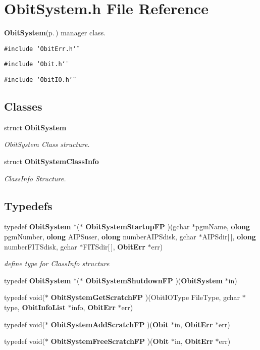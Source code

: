 \section{Obit\-System.h File Reference}
\label{ObitSystem_8h}
{\bf Obit\-System}{\rm (p.\,\pageref{structObitSystem})} manager class. 

{\tt \#include \char`\"{}Obit\-Err.h\char`\"{}}\par
{\tt \#include \char`\"{}Obit.h\char`\"{}}\par
{\tt \#include \char`\"{}Obit\-IO.h\char`\"{}}\par
\subsection*{Classes}
\begin{CompactItemize}
\item 
struct {\bf Obit\-System}
\begin{CompactList}\small\item\em Obit\-System Class structure. \item\end{CompactList}\item 
struct {\bf Obit\-System\-Class\-Info}
\begin{CompactList}\small\item\em Class\-Info Structure. \item\end{CompactList}\end{CompactItemize}
\subsection*{Typedefs}
\begin{CompactItemize}
\item 
typedef {\bf Obit\-System} $\ast$($\ast$ {\bf Obit\-System\-Startup\-FP} )(gchar $\ast$pgm\-Name, {\bf olong} pgm\-Number, {\bf olong} AIPSuser, {\bf olong} number\-AIPSdisk, gchar $\ast$AIPSdir[$\,$], {\bf olong} number\-FITSdisk, gchar $\ast$FITSdir[$\,$], {\bf Obit\-Err} $\ast$err)
\begin{CompactList}\small\item\em define type for Class\-Info structure \item\end{CompactList}\item 
typedef {\bf Obit\-System} $\ast$($\ast$ {\bf Obit\-System\-Shutdown\-FP} )({\bf Obit\-System} $\ast$in)
\item 
typedef void($\ast$ {\bf Obit\-System\-Get\-Scratch\-FP} )(Obit\-IOType File\-Type, gchar $\ast$type, {\bf Obit\-Info\-List} $\ast$info, {\bf Obit\-Err} $\ast$err)
\item 
typedef void($\ast$ {\bf Obit\-System\-Add\-Scratch\-FP} )({\bf Obit} $\ast$in, {\bf Obit\-Err} $\ast$err)
\item 
typedef void($\ast$ {\bf Obit\-System\-Free\-Scratch\-FP} )({\bf Obit} $\ast$in, {\bf Obit\-Err} $\ast$err)
\end{CompactItemize}
